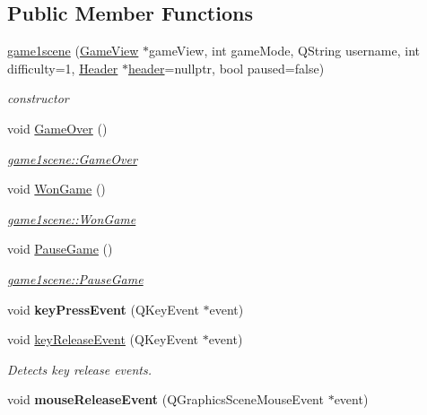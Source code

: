 \subsection*{Public Member Functions}
\begin{DoxyCompactItemize}
\item 
\hyperlink{classgame1scene_a6f8ab141252ed97f4ebcf242490a5fb5}{game1scene} (\hyperlink{classGameView}{Game\-View} $\ast$game\-View, int game\-Mode, Q\-String username, int difficulty=1, \hyperlink{classHeader}{Header} $\ast$\hyperlink{classgame1scene_a706c8a5b1b10c15dcbff1f0c57cba83a}{header}=nullptr, bool paused=false)
\begin{DoxyCompactList}\small\item\em constructor \end{DoxyCompactList}\item 
void \hyperlink{classgame1scene_a1751ec31c026f539c88b5c4540d6299c}{Game\-Over} ()
\begin{DoxyCompactList}\small\item\em \hyperlink{classgame1scene_a1751ec31c026f539c88b5c4540d6299c}{game1scene\-::\-Game\-Over} \end{DoxyCompactList}\item 
void \hyperlink{classgame1scene_a222ff5efee99acaca254846cf6faef73}{Won\-Game} ()
\begin{DoxyCompactList}\small\item\em \hyperlink{classgame1scene_a222ff5efee99acaca254846cf6faef73}{game1scene\-::\-Won\-Game} \end{DoxyCompactList}\item 
void \hyperlink{classgame1scene_a45b308a5aafab7382a414365f32b9014}{Pause\-Game} ()
\begin{DoxyCompactList}\small\item\em \hyperlink{classgame1scene_a45b308a5aafab7382a414365f32b9014}{game1scene\-::\-Pause\-Game} \end{DoxyCompactList}\item 
\hypertarget{classgame1scene_a90dccedd11f6f50c346e957a3408c40f}{void {\bfseries key\-Press\-Event} (Q\-Key\-Event $\ast$event)}\label{classgame1scene_a90dccedd11f6f50c346e957a3408c40f}

\item 
void \hyperlink{classgame1scene_a71aae166af3fd9976b870653535a1fd3}{key\-Release\-Event} (Q\-Key\-Event $\ast$event)
\begin{DoxyCompactList}\small\item\em Detects key release events. \end{DoxyCompactList}\item 
\hypertarget{classgame1scene_a8a850d31dab5b9a7bb3249622c89fca9}{void {\bfseries mouse\-Release\-Event} (Q\-Graphics\-Scene\-Mouse\-Event $\ast$event)}\label{classgame1scene_a8a850d31dab5b9a7bb3249622c89fca9}

\end{DoxyCompactItemize}
